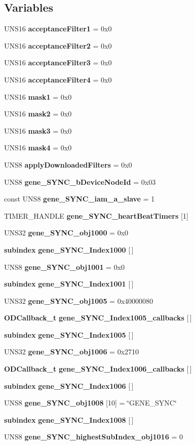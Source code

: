 \subsection*{Variables}
\begin{CompactItemize}
\item 
UNS16 {\bf acceptance\-Filter1} = 0x0
\item 
UNS16 {\bf acceptance\-Filter2} = 0x0
\item 
UNS16 {\bf acceptance\-Filter3} = 0x0
\item 
UNS16 {\bf acceptance\-Filter4} = 0x0
\item 
UNS16 {\bf mask1} = 0x0
\item 
UNS16 {\bf mask2} = 0x0
\item 
UNS16 {\bf mask3} = 0x0
\item 
UNS16 {\bf mask4} = 0x0
\item 
UNS8 {\bf apply\-Downloaded\-Filters} = 0x0
\item 
UNS8 {\bf gene\_\-SYNC\_\-b\-Device\-Node\-Id} = 0x03
\item 
const UNS8 {\bf gene\_\-SYNC\_\-iam\_\-a\_\-slave} = 1
\item 
TIMER\_\-HANDLE {\bf gene\_\-SYNC\_\-heart\-Beat\-Timers} [1]
\item 
UNS32 {\bf gene\_\-SYNC\_\-obj1000} = 0x0
\item 
{\bf subindex} {\bf gene\_\-SYNC\_\-Index1000} [$\,$]
\item 
UNS8 {\bf gene\_\-SYNC\_\-obj1001} = 0x0
\item 
{\bf subindex} {\bf gene\_\-SYNC\_\-Index1001} [$\,$]
\item 
UNS32 {\bf gene\_\-SYNC\_\-obj1005} = 0x40000080
\item 
{\bf ODCallback\_\-t} {\bf gene\_\-SYNC\_\-Index1005\_\-callbacks} [$\,$]
\item 
{\bf subindex} {\bf gene\_\-SYNC\_\-Index1005} [$\,$]
\item 
UNS32 {\bf gene\_\-SYNC\_\-obj1006} = 0x2710
\item 
{\bf ODCallback\_\-t} {\bf gene\_\-SYNC\_\-Index1006\_\-callbacks} [$\,$]
\item 
{\bf subindex} {\bf gene\_\-SYNC\_\-Index1006} [$\,$]
\item 
UNS8 {\bf gene\_\-SYNC\_\-obj1008} [10] = \char`\"{}GENE\_\-SYNC\char`\"{}
\item 
{\bf subindex} {\bf gene\_\-SYNC\_\-Index1008} [$\,$]
\item 
UNS8 {\bf gene\_\-SYNC\_\-highest\-Sub\-Index\_\-obj1016} = 0

\end{CompactItemize}
